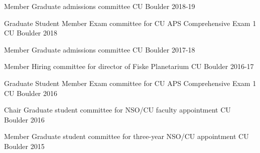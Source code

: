 

\begin{cvhonors}

  \cvhonor
  	{Member}
	{Graduate admissions committee}
	{CU Boulder}
	{2018-19}

  \cvhonor
  	{Graduate Student Member}
	{Exam committee for CU APS Comprehensive Exam 1}
	{CU Boulder}
	{2018}

  \cvhonor
  	{Member}
	{Graduate admissions committee}
	{CU Boulder}
	{2017-18}

  \cvhonor
  	{Member}
	{Hiring committee for director of Fiske Planetarium}
	{CU Boulder}
	{2016-17}

  \cvhonor
  	{Graduate Student Member}
	{Exam committee for CU APS Comprehensive Exam 1}
	{CU Boulder}
	{2016}

  \cvhonor
    {Chair} %
    {Graduate student committee for NSO/CU faculty appointment} %
    {CU Boulder} %
    {2016} %

  \cvhonor
    {Member} %
    {Graduate student committee for three-year NSO/CU appointment} %
    {CU Boulder} %
    {2015} %

\end{cvhonors}
